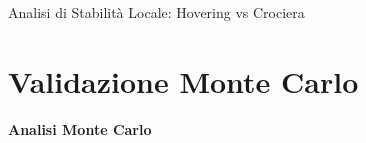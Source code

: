 \documentclass[aspectratio=169]{beamer} %
\begin{document}
\begin{frame}{Analisi di Stabilità Locale: Hovering vs Crociera}
\end{frame}

\section{Validazione Monte Carlo}
\begin{frame}
    \vfill
    \begin{center}
        \Huge \textbf{Analisi Monte Carlo}
    \end{center}
    \vfill
\end{frame}
\end{document}
